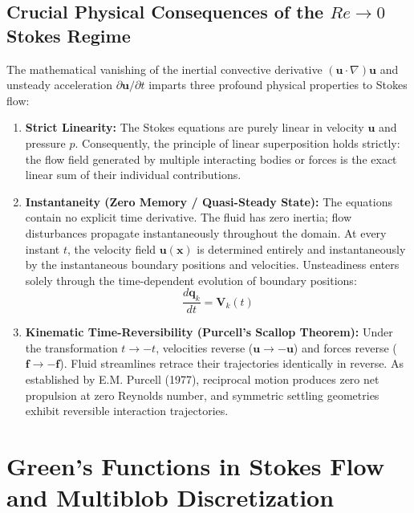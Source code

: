 \documentclass[11pt,a4paper]{article}
\begin{document}
\subsection{Crucial Physical Consequences of the $Re \to 0$ Stokes Regime}
The mathematical vanishing of the inertial convective derivative $(\mathbf{u} \cdot \nabla)\mathbf{u}$ and unsteady acceleration $\partial \mathbf{u}/\partial t$ imparts three profound physical properties to Stokes flow:
\begin{enumerate}
    \item \textbf{Strict Linearity:} The Stokes equations are purely linear in velocity $\mathbf{u}$ and pressure $p$. Consequently, the principle of linear superposition holds strictly: the flow field generated by multiple interacting bodies or forces is the exact linear sum of their individual contributions.
    \item \textbf{Instantaneity (Zero Memory / Quasi-Steady State):} The equations contain no explicit time derivative. The fluid has zero inertia; flow disturbances propagate instantaneously throughout the domain. At every instant $t$, the velocity field $\mathbf{u}(\mathbf{x})$ is determined entirely and instantaneously by the instantaneous boundary positions and velocities. Unsteadiness enters solely through the time-dependent evolution of boundary positions:
    \begin{equation}
        \frac{d\mathbf{q}_k}{dt} = \mathbf{V}_k(t)
    \end{equation}
    \item \textbf{Kinematic Time-Reversibility (Purcell's Scallop Theorem):} Under the transformation $t \to -t$, velocities reverse ($\mathbf{u} \to -\mathbf{u}$) and forces reverse ($\mathbf{f} \to -\mathbf{f}$). Fluid streamlines retrace their trajectories identically in reverse. As established by E.M. Purcell (1977), reciprocal motion produces zero net propulsion at zero Reynolds number, and symmetric settling geometries exhibit reversible interaction trajectories.
\end{enumerate}

\section{Green's Functions in Stokes Flow and Multiblob Discretization}
\end{document}
